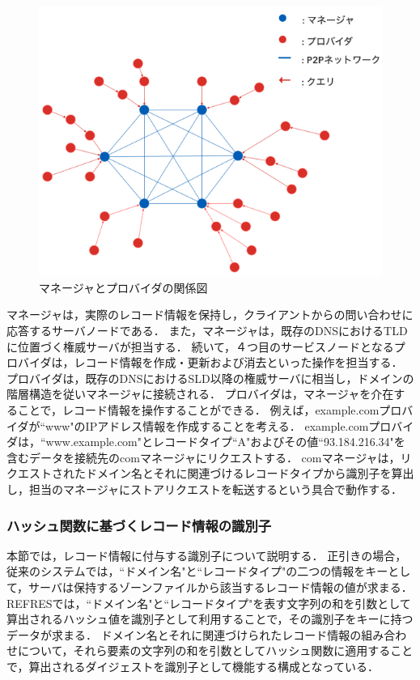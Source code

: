 \begin{figure}[bh]
 \centering
 \includegraphics[scale=0.5]{figure/manager-provider.png}
 \caption{マネージャとプロバイダの関係図}
 \label{fig:manager-provider}
\end{figure}

マネージャは，実際のレコード情報を保持し，クライアントからの問い合わせに応答するサーバノードである．
また，マネージャは，既存のDNSにおけるTLDに位置づく権威サーバが担当する．
続いて，４つ目のサービスノードとなるプロバイダは，レコード情報を作成・更新および消去といった操作を担当する．
プロバイダは，既存のDNSにおけるSLD以降の権威サーバに相当し，ドメインの階層構造を従いマネージャに接続される．
プロバイダは，マネージャを介在することで，レコード情報を操作することができる．
例えば，example.comプロバイダが``www"のIPアドレス情報を作成することを考える．
example.comプロバイダは，``www.example.com"とレコードタイプ``A"およびその値``93.184.216.34"を含むデータを接続先のcomマネージャにリクエストする．
comマネージャは，リクエストされたドメイン名とそれに関連づけるレコードタイプから識別子を算出し，担当のマネージャにストアリクエストを転送するという具合で動作する．

%

\subsubsection{ハッシュ関数に基づくレコード情報の識別子}
本節では，レコード情報に付与する識別子について説明する．
正引きの場合，従来のシステムでは，``ドメイン名"と``レコードタイプ"の二つの情報をキーとして，サーバは保持するゾーンファイルから該当するレコード情報の値が求まる．
REFRESでは，``ドメイン名"と``レコードタイプ"を表す文字列の和を引数として算出されるハッシュ値を識別子として利用することで，その識別子をキーに持つデータが求まる．
ドメイン名とそれに関連づけられたレコード情報の組み合わせについて，それら要素の文字列の和を引数としてハッシュ関数に適用することで，算出されるダイジェストを識別子として機能する構成となっている．

